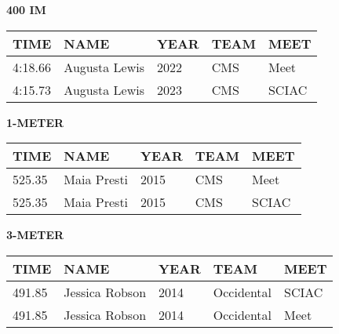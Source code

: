 \vspace{0.4cm}

\begin{center}
\begin{minipage}[t]{0.7\textwidth}
\centering
\textbf{400 IM}\\[0.05cm]
\begin{tabular}{@{}p{1.8cm}p{2.8cm}p{1.2cm}p{1.4cm}p{1.4cm}@{}}
\hline
\textbf{TIME} & \textbf{NAME} & \textbf{YEAR} & \textbf{TEAM} & \textbf{MEET} \\
\hline
4:18.66 & Augusta Lewis & 2022 & CMS & Meet \\
4:15.73 & Augusta Lewis & 2023 & CMS & SCIAC \\
\hline
\end{tabular}
\end{minipage}
\end{center}

\vspace{0.4cm}

\begin{center}
\begin{minipage}[t]{0.7\textwidth}
\centering
\textbf{1-METER}\\[0.05cm]
\begin{tabular}{@{}p{1.8cm}p{2.8cm}p{1.2cm}p{1.4cm}p{1.4cm}@{}}
\hline
\textbf{TIME} & \textbf{NAME} & \textbf{YEAR} & \textbf{TEAM} & \textbf{MEET} \\
\hline
525.35 & Maia Presti & 2015 & CMS & Meet \\
525.35 & Maia Presti & 2015 & CMS & SCIAC \\
\hline
\end{tabular}
\end{minipage}
\end{center}

\vspace{0.4cm}

\begin{center}
\begin{minipage}[t]{0.7\textwidth}
\centering
\textbf{3-METER}\\[0.05cm]
\begin{tabular}{@{}p{1.8cm}p{2.8cm}p{1.2cm}p{1.4cm}p{1.4cm}@{}}
\hline
\textbf{TIME} & \textbf{NAME} & \textbf{YEAR} & \textbf{TEAM} & \textbf{MEET} \\
\hline
491.85 & Jessica Robson & 2014 & Occidental & SCIAC \\
491.85 & Jessica Robson & 2014 & Occidental & Meet \\
\hline
\end{tabular}
\end{minipage}
\end{center}

